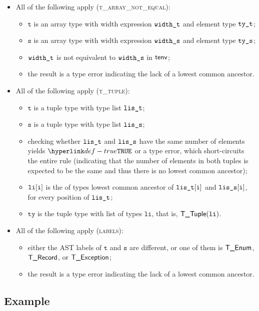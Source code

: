 \documentclass{book}
\newcommand\vt[0]{\texttt{t}}
\newcommand\vs[0]{\texttt{s}}
\newcommand\tty[0]{\texttt{ty}}
\newcommand\vli[0]{\texttt{li}}
\begin{document}
\begin{itemize}
\begin{itemize}
    \item All of the following apply (\textsc{t\_array\_not\_equal}):
    \begin{itemize}
      \item $\vt$ is an array type with width expression $\texttt{width\_t}$ and element type $\texttt{ty\_t}$;
      \item $\vs$ is an array type with width expression $\texttt{width\_s}$ and element type $\texttt{ty\_s}$;
      \item $\texttt{width\_t}$ is not equivalent to $\texttt{width\_s}$ in $\textsf{tenv}$;
      \item the result is a type error indicating the lack of a lowest common ancestor.
    \end{itemize}

    \item All of the following apply (\textsc{t\_tuple}):
    \begin{itemize}
      \item $\vt$ is a tuple type with type list $\texttt{lis\_t}$;
      \item $\vs$ is a tuple type with type list $\texttt{lis\_s}$;
      \item checking whether $\texttt{lis\_t}$ and $\texttt{lis\_s}$ have the same number of elements yields $\True$
            or a type error, which short-circuits the entire rule (indicating that the number of elements in both tuples is expected
            to be the same and thus there is no lowest common ancestor);
      \item $\vli[\vi]$ is the of types lowest common ancestor of $\texttt{lis\_t}[\texttt{i}]$ and $\texttt{lis\_s}[\texttt{i}]$, for every position of $\texttt{lis\_t}$;
      \item $\tty$ is the tuple type with list of types $\vli$, that is, $\TTuple(\vli)$.
    \end{itemize}

    \item All of the following apply (\textsc{labels}):
    \begin{itemize}
      \item either the AST labels of $\vt$ and $\vs$ are different, or one of them is $\textsf{T\_Enum}$, $\textsf{T\_Record}$, or $\textsf{T\_Exception}$;
      \item the result is a type error indicating the lack of a lowest common ancestor.
    \end{itemize}
  \end{itemize}
\end{itemize}

\subsection{Example}
\end{document}
